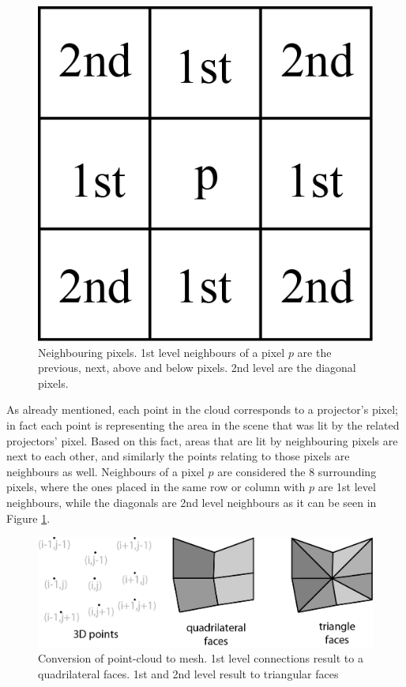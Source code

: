 \documentclass[final,12pt,3p]{elsarticle}
\begin{document}
\begin{figure}[!ht]
	\centering
	\includegraphics[scale=0.6]{./neighbourPixels.png}
	\caption{\label{fig:neighboringPixels} Neighbouring pixels. 1st level neighbours of a pixel $p$ are the previous, next, above and below pixels. 2nd level are the diagonal pixels.}
\end{figure}

As already mentioned, each point in the cloud corresponds to a projector's pixel; in fact each point is representing the area in the scene that was lit by the related projectors' pixel. Based on this fact, areas that are lit by neighbouring pixels are next to each other, and similarly the points relating to those pixels are neighbours as well. Neighbours of a pixel $p$ are considered the 8 surrounding pixels, where the ones placed in the same row or column with $p$ are 1st level neighbours, while the diagonals are 2nd level neighbours as it can be seen in Figure \ref{fig:neighboringPixels}.

\begin{figure}[!ht]
	\centering
	\includegraphics[scale=0.8]{./triang_and_quad_mesh.png}
	\caption{\label{fig:mesh49} Conversion of point-cloud to mesh. 1st level connections result to a quadrilateral faces. 1st and 2nd level result to triangular faces }
\end{figure}
\end{document}

